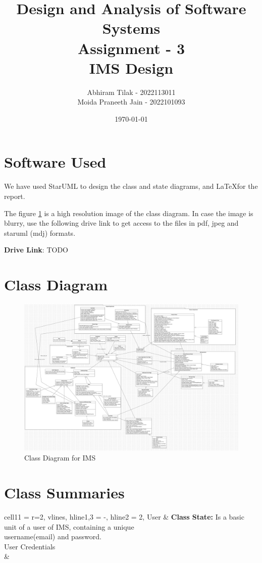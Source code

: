 \documentclass[11pt]{article}
\title{ Design and Analysis of Software Systems \\ Assignment - 3 \\ IMS Design}
\author{ Abhiram Tilak - 2022113011 \\ Moida Praneeth Jain - 2022101093 }
\date{\today}
\begin{document}
\maketitle

\section{Software Used}

We have used StarUML to design the class and state diagrams,
and \LaTeX  for the report.

The figure \ref{class} is a high resolution image of the class diagram. In case the image is blurry, 
use the following drive link to get access to the files in pdf, jpeg and staruml (mdj) formats.

\textbf{Drive Link}: TODO


\section{Class Diagram}

\pagebreak

\begin{figure}[!ht]
    \center
\includegraphics[width=8in,angle=90]{class_diagram/Main.png}
\caption{Class Diagram for IMS}
\label{class}
\end{figure}

\pagebreak

\section{Class Summaries}

\begin{longtblr}[
  label = none,
  entry = none,
]{
  cell{1}{1} = {r=2}{},
  vlines,
  hline{1,3} = {-}{},
  hline{2} = {2}{},
}
User & {\textbf{Class State: }Is a basic unit of a user of IMS, containing a unique\\ username(email)
and password.\\\hspace{\dimexpr\labelsep+0.5\tabcolsep}User Credentials} \\
     &
\end{longtblr}
\end{document}
